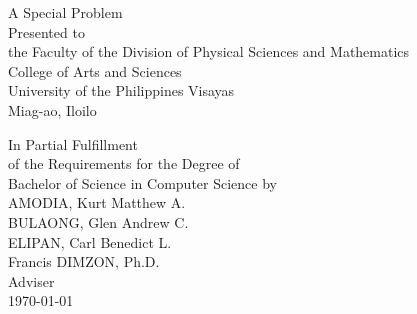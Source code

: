 \begin{titlepage}
\centering


\vspace{0.875cm}
A Special Problem\\
Presented to\\
the Faculty of the Division of Physical Sciences and Mathematics\\
College of Arts and Sciences\\
University of the Philippines Visayas\\
Miag-ao, Iloilo

\vspace{0.875cm}
In Partial Fulfillment\\
of the Requirements for the Degree of\\
Bachelor of Science in Computer Science
\vspace{1.75cm}
by\\

\vspace{0.1cm}
AMODIA, Kurt Matthew A.  \\
BULAONG, Glen Andrew C. \\
ELIPAN, Carl Benedict L.   \\

\vspace{0.875cm}
Francis DIMZON, Ph.D. \\
Adviser\\


\vspace{0.875cm}
\today
\end{titlepage}
